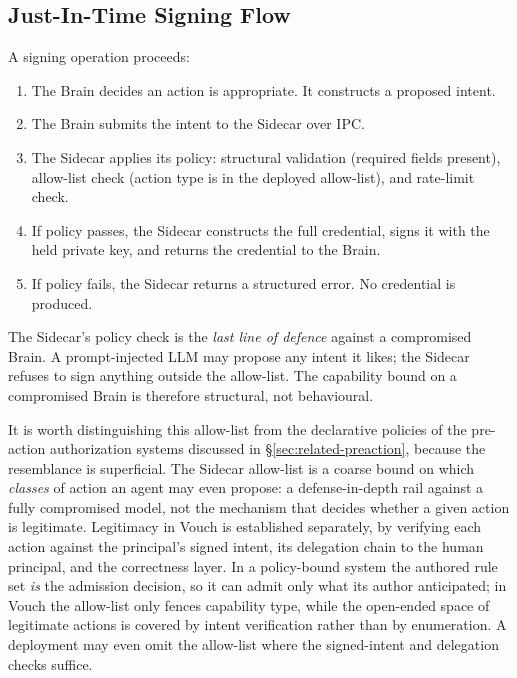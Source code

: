 \documentclass[11pt,a4paper]{article}
\begin{document}
\subsection{Just-In-Time Signing Flow}

A signing operation proceeds:

\begin{enumerate}[label=\arabic*.,leftmargin=*]
\item The Brain decides an action is appropriate. It constructs a proposed intent.
\item The Brain submits the intent to the Sidecar over IPC.
\item The Sidecar applies its policy: structural validation (required fields present), allow-list check (action type is in the deployed allow-list), and rate-limit check.
\item If policy passes, the Sidecar constructs the full credential, signs it with the held private key, and returns the credential to the Brain.
\item If policy fails, the Sidecar returns a structured error. No credential is produced.
\end{enumerate}

The Sidecar's policy check is the \emph{last line of defence} against a compromised Brain. A prompt-injected LLM may propose any intent it likes; the Sidecar refuses to sign anything outside the allow-list. The capability bound on a compromised Brain is therefore structural, not behavioural.

It is worth distinguishing this allow-list from the declarative policies of the pre-action authorization systems discussed in \S\ref{sec:related-preaction}, because the resemblance is superficial. The Sidecar allow-list is a coarse bound on which \emph{classes} of action an agent may even propose: a defense-in-depth rail against a fully compromised model, not the mechanism that decides whether a given action is legitimate. Legitimacy in Vouch is established separately, by verifying each action against the principal's signed intent, its delegation chain to the human principal, and the correctness layer. In a policy-bound system the authored rule set \emph{is} the admission decision, so it can admit only what its author anticipated; in Vouch the allow-list only fences capability type, while the open-ended space of legitimate actions is covered by intent verification rather than by enumeration. A deployment may even omit the allow-list where the signed-intent and delegation checks suffice.
\end{document}
